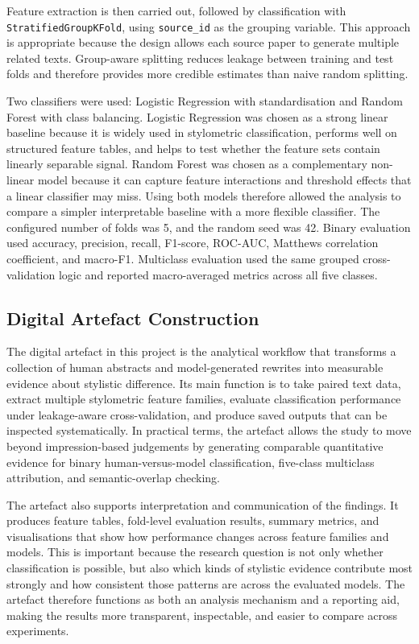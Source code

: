 \documentclass[12pt,a4paper]{article}
\begin{document}
Feature extraction is then carried out, followed by classification with \texttt{StratifiedGroupKFold}, using \texttt{source\_id} as the grouping variable. This approach is appropriate because the design allows each source paper to generate multiple related texts. Group-aware splitting reduces leakage between training and test folds and therefore provides more credible estimates than naive random splitting.

Two classifiers were used: Logistic Regression with standardisation and Random Forest with class balancing. Logistic Regression was chosen as a strong linear baseline because it is widely used in stylometric classification, performs well on structured feature tables, and helps to test whether the feature sets contain linearly separable signal. Random Forest was chosen as a complementary non-linear model because it can capture feature interactions and threshold effects that a linear classifier may miss. Using both models therefore allowed the analysis to compare a simpler interpretable baseline with a more flexible classifier. The configured number of folds was 5, and the random seed was 42. Binary evaluation used accuracy, precision, recall, F1-score, ROC-AUC, Matthews correlation coefficient, and macro-F1. Multiclass evaluation used the same grouped cross-validation logic and reported macro-averaged metrics across all five classes.

\subsection{Digital Artefact Construction}

The digital artefact in this project is the analytical workflow that transforms a collection of human abstracts and model-generated rewrites into measurable evidence about stylistic difference. Its main function is to take paired text data, extract multiple stylometric feature families, evaluate classification performance under leakage-aware cross-validation, and produce saved outputs that can be inspected systematically. In practical terms, the artefact allows the study to move beyond impression-based judgements by generating comparable quantitative evidence for binary human-versus-model classification, five-class multiclass attribution, and semantic-overlap checking.

The artefact also supports interpretation and communication of the findings. It produces feature tables, fold-level evaluation results, summary metrics, and visualisations that show how performance changes across feature families and models. This is important because the research question is not only whether classification is possible, but also which kinds of stylistic evidence contribute most strongly and how consistent those patterns are across the evaluated models. The artefact therefore functions as both an analysis mechanism and a reporting aid, making the results more transparent, inspectable, and easier to compare across experiments.
\end{document}
